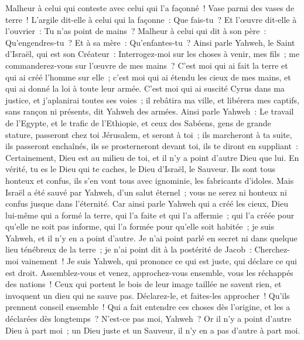 \begin{multicols}{2}
Malheur à celui qui conteste avec celui qui l'a façonné~! Vase parmi des vases de terre~! L'argile dit-elle à celui qui la façonne~: Que fais-tu~? Et l'œuvre dit-elle à l'ouvrier~: Tu n'as point de mains~?
Malheur à celui qui dit à son père~: Qu'engendres-tu~? Et à sa mère~: Qu'enfantes-tu~?
Ainsi parle Yahweh, le Saint d'Israël, qui est son Créateur~: Interrogez-moi sur les choses à venir, mes fils~; me commanderez-vous sur l'œuvre de mes mains~?
C'est moi qui ai fait la terre et qui ai créé l'homme sur elle~; c'est moi qui ai étendu les cieux de mes mains, et qui ai donné la loi à toute leur armée.
C'est moi qui ai suscité Cyrus dans ma justice, et j'aplanirai toutes ses voies~; il rebâtira ma ville, et libérera mes captifs, sans rançon ni présents, dit Yahweh des armées.
Ainsi parle Yahweh~: Le travail de l'Egypte, et le trafic de l'Ethiopie, et ceux des Sabéens, gens de grande stature, passeront chez toi Jérusalem, et seront à toi~; ils marcheront à ta suite, ils passeront enchaînés, ils se prosterneront devant toi, ils te diront en suppliant~: Certainement, Dieu est au milieu de toi, et il n'y a point d'autre Dieu que lui.
En vérité, tu es le Dieu qui te caches, le Dieu d'Israël, le Sauveur.
Ils sont tous honteux et confus, ils s'en vont tous avec ignominie, les fabricants d'idoles.
Mais Israël a été sauvé par Yahweh, d'un salut éternel~; vous ne serez ni honteux ni confus jusque dans l'éternité.
Car ainsi parle Yahweh qui a créé les cieux, Dieu lui-même qui a formé la terre, qui l'a faite et qui l'a affermie~; qui l'a créée pour qu'elle ne soit pas informe, qui l'a formée pour qu'elle soit habitée~; je suis Yahweh, et il n'y en a point d'autre.
Je n'ai point parlé en secret ni dans quelque lieu ténébreux de la terre~; je n'ai point dit à la postérité de Jacob~: Cherchez-moi vainement~! Je suis Yahweh, qui prononce ce qui est juste, qui déclare ce qui est droit.
Assemblez-vous et venez, approchez-vous ensemble, vous les réchappés des nations~! Ceux qui portent le bois de leur image taillée ne savent rien, et invoquent un dieu qui ne sauve pas.
Déclarez-le, et faites-les approcher~! Qu'ils prennent conseil ensemble~! Qui a fait entendre ces choses dès l'origine, et les a déclarées dès longtemps~? N'est-ce pas moi, Yahweh~? Or il n'y a point d'autre Dieu à part moi~; un Dieu juste et un Sauveur, il n'y en a pas d'autre à part moi.

\end{multicols}
